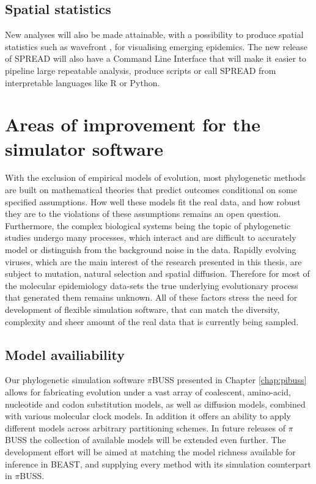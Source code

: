 \subsection{Spatial statistics}

New analyses will also be made attainable, with a possibility to produce spatial statistics such as wavefront \citep{Pybus2012}, for visualising emerging epidemics.
The new release of SPREAD will also have a Command Line Interface that will make it easier to pipeline large repeatable analysis, produce scripts or call SPREAD from interpretable languages like R \citep{RCran} or Python.


\section{Areas of improvement for the {\bussname} simulator software}

With the exclusion of empirical models of evolution, most phylogenetic methods are built on mathematical theories that predict outcomes conditional on some specified assumptions.
How well these models fit the real data, and how robust they are to the violations of these assumptions remains an open question.
Furthermore, the complex biological systems being the topic of phylogenetic studies undergo many processes, which interact and are difficult to accurately model or distinguish from the background noise in the data.
Rapidly evolving viruses, which are the main interest of the research presented in this thesis, are subject to mutation, natural selection and spatial diffusion.
Therefore for most of the molecular epidemiology data-sets the true underlying evolutionary process that generated them remains unknown.
All of these factors stress the need for development of flexible simulation software, that can match the diversity, complexity and sheer amount of the real data that is currently being sampled.

\subsection{Model availiability}

Our phylogenetic simulation software $\pi$BUSS presented in Chapter \ref{chap:pibuss} allows for fabricating evolution under a vast array of coalescent, amino-acid, nucleotide and codon substitution models, as well as diffusion models, combined with various molecular clock models.
In addition it offers an ability to apply different models across arbitrary partitioning schemes.
In future releases of $\pi$BUSS the collection of available models will be extended even further.
The development effort will be aimed at matching the model richness available for inference in BEAST, and supplying every method with its simulation counterpart in $\pi$BUSS.


